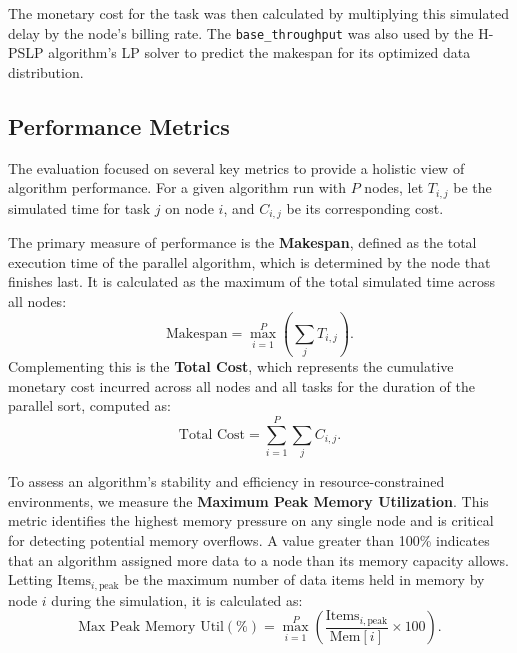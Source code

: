 \documentclass{article}
\begin{document}
The monetary cost for the task was then calculated by multiplying this simulated delay by the node's billing rate. The \texttt{base\_throughput} was also used by the H-PSLP algorithm's LP solver to predict the makespan for its optimized data distribution.

\subsection{Performance Metrics}

The evaluation focused on several key metrics to provide a holistic view of algorithm performance. For a given algorithm run with $P$ nodes, let $T_{i,j}$ be the simulated time for task $j$ on node $i$, and $C_{i,j}$ be its corresponding cost.

The primary measure of performance is the \textbf{Makespan}, defined as the total execution time of the parallel algorithm, which is determined by the node that finishes last. It is calculated as the maximum of the total simulated time across all nodes:
\[ \text{Makespan} = \max_{i=1}^{P} \left( \sum_{j} T_{i,j} \right). \]
Complementing this is the \textbf{Total Cost}, which represents the cumulative monetary cost incurred across all nodes and all tasks for the duration of the parallel sort, computed as:
\[ \text{Total Cost} = \sum_{i=1}^{P} \sum_{j} C_{i,j}. \]

To assess an algorithm's stability and efficiency in resource-constrained environments, we measure the \textbf{Maximum Peak Memory Utilization}. This metric identifies the highest memory pressure on any single node and is critical for detecting potential memory overflows. A value greater than 100\% indicates that an algorithm assigned more data to a node than its memory capacity allows. Letting $\text{Items}_{i, \text{peak}}$ be the maximum number of data items held in memory by node $i$ during the simulation, it is calculated as:
\[ \text{Max Peak Memory Util} (\%) = \max_{i=1}^{P} \left( \frac{\text{Items}_{i, \text{peak}}}{\text{Mem}[i]} \times 100 \right). \]
\end{document}
